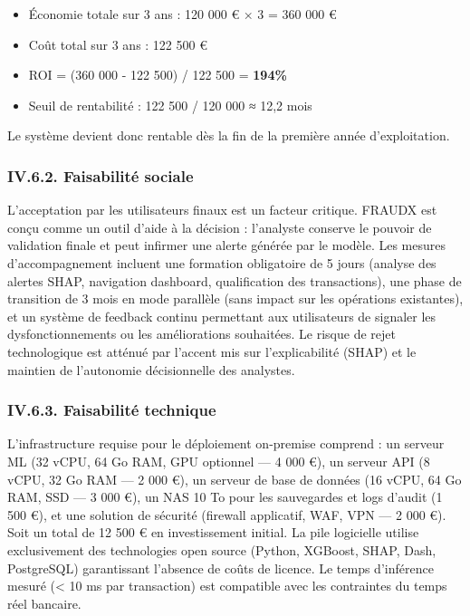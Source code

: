 \documentclass[
  12pt,
]{article}
\providecommand{\tightlist}{%
  \setlength{\itemsep}{0pt}\setlength{\parskip}{0pt}}
\begin{document}
\begin{itemize}
\tightlist
\item
  Économie totale sur 3 ans : 120 000 € × 3 = 360 000 €
\item
  Coût total sur 3 ans : 122 500 €
\item
  ROI = (360 000 - 122 500) / 122 500 = \textbf{194\%}
\item
  Seuil de rentabilité : 122 500 / 120 000 ≈ 12,2 mois
\end{itemize}

Le système devient donc rentable dès la fin de la première année
d’exploitation.

\subsubsection{IV.6.2. Faisabilité
sociale}\label{iv.6.2.-faisabilituxe9-sociale}

L’acceptation par les utilisateurs finaux est un facteur critique.
FRAUDX est conçu comme un outil d’aide à la décision : l’analyste
conserve le pouvoir de validation finale et peut infirmer une alerte
générée par le modèle. Les mesures d’accompagnement incluent une
formation obligatoire de 5 jours (analyse des alertes SHAP, navigation
dashboard, qualification des transactions), une phase de transition de 3
mois en mode parallèle (sans impact sur les opérations existantes), et
un système de feedback continu permettant aux utilisateurs de signaler
les dysfonctionnements ou les améliorations souhaitées. Le risque de
rejet technologique est atténué par l’accent mis sur l’explicabilité
(SHAP) et le maintien de l’autonomie décisionnelle des analystes.

\subsubsection{IV.6.3. Faisabilité
technique}\label{iv.6.3.-faisabilituxe9-technique}

L’infrastructure requise pour le déploiement on-premise comprend : un
serveur ML (32 vCPU, 64 Go RAM, GPU optionnel — 4 000 €), un serveur API
(8 vCPU, 32 Go RAM — 2 000 €), un serveur de base de données (16 vCPU,
64 Go RAM, SSD — 3 000 €), un NAS 10 To pour les sauvegardes et logs
d’audit (1 500 €), et une solution de sécurité (firewall applicatif,
WAF, VPN — 2 000 €). Soit un total de 12 500 € en investissement
initial. La pile logicielle utilise exclusivement des technologies open
source (Python, XGBoost, SHAP, Dash, PostgreSQL) garantissant l’absence
de coûts de licence. Le temps d’inférence mesuré (\textless{} 10 ms par
transaction) est compatible avec les contraintes du temps réel bancaire.
\end{document}
